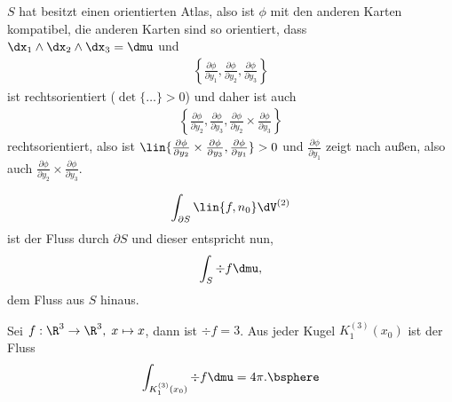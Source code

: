 \begin{bemn}
$S$ hat besitzt einen orientierten Atlas, also ist $\phi$ mit den
anderen Karten kompatibel, die anderen Karten sind so orientiert, dass
 $\dx_1\land\dx_2\land\dx_3 = \dmu$ und
\begin{align*}
\left\{\frac{\partial\phi}{\partial y_1}, \frac{\partial\phi}{\partial y_2},
\frac{\partial\phi}{\partial y_3}\right\}
\end{align*}
ist rechtsorientiert ($\det\{\ldots\}> 0$) und daher ist auch
\begin{align*}
\left\{\frac{\partial\phi}{\partial y_2}, \frac{\partial\phi}{\partial y_3},
\frac{\partial\phi}{\partial y_2}\times\frac{\partial\phi}{\partial y_3}\right\}
\end{align*}
rechtsorientiert, also ist $\lin{\frac{\partial\phi}{\partial
y_2}\times\frac{\partial\phi}{\partial y_3}, \frac{\partial\phi}{\partial
y_1}} > 0$ und $\frac{\partial\phi}{\partial
y_1}$ zeigt nach außen, also auch $\frac{\partial\phi}{\partial
y_2}\times\frac{\partial\phi}{\partial y_3}$.\maphere
\end{bemn}

\begin{prop}
\label{prop:4.58}
\begin{align*}
\int_{\partial S} \lin{f,n_0}\dV^{(2)}
\end{align*}
ist der Fluss durch $\partial S$ und dieser entspricht nun,
\begin{align*}
\int_S \div f\dmu,
\end{align*} 
dem Fluss aus $S$ hinaus.\fishhere
\end{prop}

\begin{bspn}
Sei $f: \R^3\to\R^3,\; x\mapsto x$, dann ist $\div f = 3$. Aus jeder Kugel
$K_1^{(3)}(x_0)$ ist der Fluss
\begin{align*}
\int_{K_1^{(3)}(x_0)} \div f \dmu = 4\pi.\bsphere
\end{align*}
\end{bspn}

